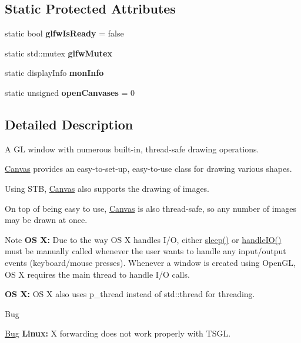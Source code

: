 \subsection*{Static Protected Attributes}
\begin{DoxyCompactItemize}
\item 
\mbox{\label{classtsgl_1_1_canvas_a67ea3938e72415f16a803cd02d2ab56a}} 
static bool {\bfseries glfw\+Is\+Ready} = false
\item 
\mbox{\label{classtsgl_1_1_canvas_a6d4eee3bc63664cd993489d88353920c}} 
static std\+::mutex {\bfseries glfw\+Mutex}
\item 
\mbox{\label{classtsgl_1_1_canvas_af2b8ccd7d0dbf505b17b2125ad6e9d21}} 
static display\+Info {\bfseries mon\+Info}
\item 
\mbox{\label{classtsgl_1_1_canvas_aaedefa605af13db2578d1ce705d5b85b}} 
static unsigned {\bfseries open\+Canvases} = 0
\end{DoxyCompactItemize}


\subsection{Detailed Description}
A GL window with numerous built-\/in, thread-\/safe drawing operations. 

\hyperlink{classtsgl_1_1_canvas}{Canvas} provides an easy-\/to-\/set-\/up, easy-\/to-\/use class for drawing various shapes.

Using S\+TB, \hyperlink{classtsgl_1_1_canvas}{Canvas} also supports the drawing of images.

On top of being easy to use, \hyperlink{classtsgl_1_1_canvas}{Canvas} is also thread-\/safe, so any number of images may be drawn at once. \begin{DoxyNote}{Note}
{\bfseries OS X\+:} Due to the way OS X handles I/O, either \hyperlink{classtsgl_1_1_canvas_a2604fa056d4541f918ccf447eda1f3cf}{sleep()} or \hyperlink{classtsgl_1_1_canvas_aa499851e5e4b97bb99ca4fb3d633c17e}{handle\+I\+O()} must be manually called whenever the user wants to handle any input/output events (keyboard/mouse presses). Whenever a window is created using Open\+GL, OS X requires the main thread to handle I/O calls. 

{\bfseries OS X\+:} OS X also uses p\+\_\+thread instead of std\+::thread for threading. 
\end{DoxyNote}
\begin{DoxyRefDesc}{Bug}
\item[\hyperlink{bug__bug000002}{Bug}]{\bfseries Linux\+:} X forwarding does not work properly with T\+S\+GL. \end{DoxyRefDesc}


